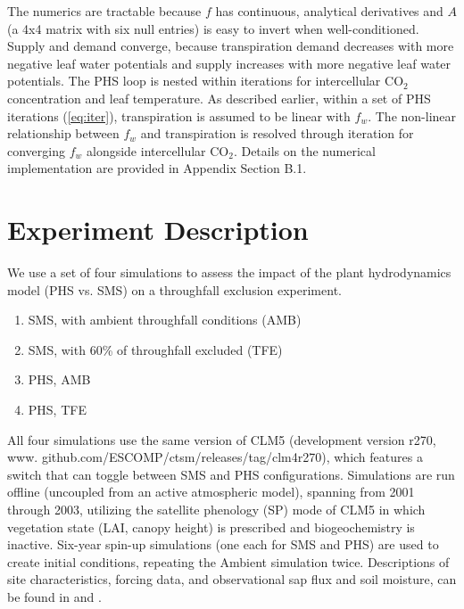 \documentclass[draft,linenumbers]{agujournal}
\begin{document}
    The numerics are tractable because $f$ has continuous, analytical derivatives and $A$ (a 4x4 matrix with six null entries) is easy to invert when well-conditioned. Supply and demand converge, because transpiration demand decreases with more negative leaf water potentials and supply increases with more negative leaf water potentials. The PHS loop is nested within iterations for intercellular CO$_2$ concentration and leaf temperature. As described earlier, within a set of PHS iterations (\ref{eq:iter}), transpiration is assumed to be linear with $f_w$.  The non-linear relationship between $f_w$ and transpiration is resolved through iteration for converging $f_w$ alongside intercellular CO$_2$. Details on the numerical implementation are provided in Appendix Section B.1.
   
\section{Experiment Description}

We use a set of four simulations to assess the impact of the plant hydrodynamics model (PHS vs. SMS) on a throughfall exclusion experiment.
\begin{enumerate}
\item SMS, with ambient throughfall conditions (AMB)
\item SMS, with 60\% of throughfall excluded (TFE)
\item PHS, AMB
\item PHS, TFE
\end{enumerate}

All four simulations use the same version of CLM5
(development version r270, www. github.com/ESCOMP/ctsm/releases/tag/clm4\textunderscore r270),
which features a switch that can toggle between SMS and PHS configurations.
Simulations are run offline (uncoupled from an active atmospheric model), spanning from 2001 through 2003, utilizing the satellite phenology (SP) mode of CLM5 in which vegetation state (LAI, canopy height) is prescribed and biogeochemistry is inactive. Six-year spin-up simulations (one each for SMS and PHS) are used to create initial conditions, repeating the Ambient simulation twice. Descriptions of site characteristics, forcing data, and observational sap flux and soil moisture, can be found in \cite{fisher2007} and \cite{fisher2008}.
\end{document}
